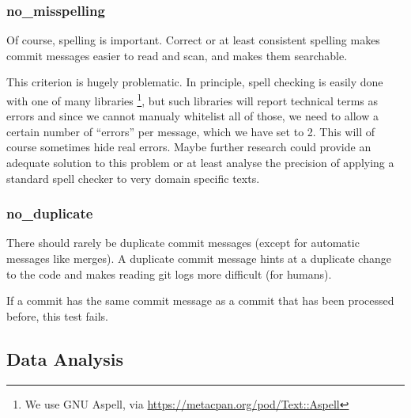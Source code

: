 \subsubsection{no\_misspelling}
\label{subs:no_misspelling}
Of course, spelling is important. Correct or at least consistent spelling makes commit messages easier to read and scan, and makes them searchable.

This criterion is hugely problematic. In principle, spell checking is easily done with one of many libraries \footnote{We use GNU Aspell, via \url{https://metacpan.org/pod/Text::Aspell}}, but such libraries will report technical terms as errors and since we cannot manualy whitelist all of those, we need to allow a certain number of ``errors'' per message, which we have set to 2. This will of course sometimes hide real errors. Maybe further research could provide an adequate solution to this problem or at least analyse the precision of applying a standard spell checker to very domain specific texts.

\subsubsection{no\_duplicate}
\label{subs:no_duplicate}
There should rarely be duplicate commit messages (except for automatic messages like merges). A duplicate commit message hints at a duplicate change to the code and makes reading git logs more difficult (for humans).

If a commit has the same commit message as a commit that has been processed before, this test fails.


\subsection{Data Analysis}
\label{sub:analysis}

%
%
%
%
%
%

